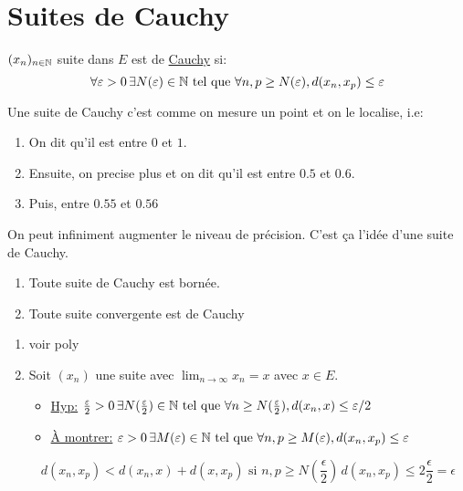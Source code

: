 \section{Suites de Cauchy}
\begin{definition}
    $(x_n)_{n \in \mathbb{N}}$ suite dans $E$ est de \underline{Cauchy} si:
     \[
    \forall \varepsilon > 0 \, \exists N(\varepsilon) \in \mathbb{N} \text{ tel que } \forall n, p \ge N(\varepsilon), d(x_n, x_p) \le \varepsilon
    \] 
\end{definition}
\begin{intuition}
   Une suite de Cauchy c'est comme on mesure un point et on le localise, i.e:
   \begin{enumerate}
       \item On dit qu'il est entre $0$ et  $1$.
       \item Ensuite, on precise plus et on dit qu'il est entre  $0.5$ et  $0.6$.
       \item Puis, entre  $0.55$ et  $0.56$
   \end{enumerate}
   On peut infiniment augmenter le niveau de précision. C'est ça l'idée d'une suite de Cauchy.
\end{intuition}
\begin{prop}
   \begin{enumerate}
       \item Toute suite de Cauchy est bornée.
        \item Toute suite convergente est de Cauchy
   \end{enumerate} 
\end{prop}
\begin{preuve}
   \begin{enumerate}
       \item voir poly
       \item Soit $(x_n)$ une suite avec  $\lim_{n \to \infty} x_n = x$ avec $x \in E$.
           \begin{itemize}
               \item 
                   \underline{Hyp:}  $\frac{\varepsilon}{2} > 0 \, \exists N(\frac{\varepsilon}{2}) \in \mathbb{N} \text{ tel que } \forall n \ge N(\frac{\varepsilon}{2}), d(x_n, x) \le \varepsilon/2$
                \item 
                    \underline{À montrer:} $\varepsilon > 0 \, \exists M(\varepsilon) \in \mathbb{N} \text{ tel que } \forall n, p \ge M(\varepsilon), d(x_n, x_p) \le \varepsilon$
           \end{itemize}
           \[
               d(x_n, x_p) < d(x_n, x) + d(x, x_p) \text{ si } n, p \ge  N(\frac{\epsilon}{2}) \, d(x_n, x_p) \le 2 \frac{\epsilon}{2} = \epsilon
           \] 
   \end{enumerate} 
\end{preuve}
